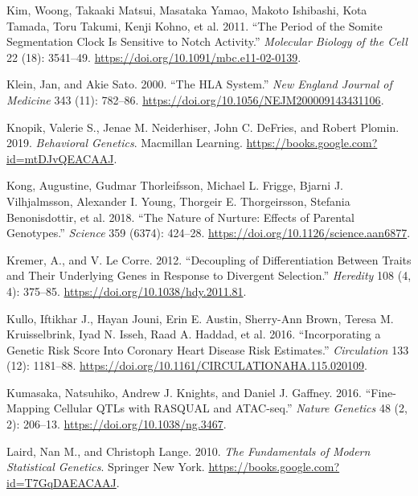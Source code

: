 \documentclass[
]{book}
\newlength{\cslhangindent}
\newlength{\cslentryspacingunit} %
\newenvironment{CSLReferences}[2] %
 {%
  \setlength{\parindent}{0pt}
  \ifodd #1
  \let\oldpar\par
  \def\par{\hangindent=\cslhangindent\oldpar}
  \fi
  \setlength{\parskip}{#2\cslentryspacingunit}
 }%
 {}
\begin{document}
\begin{CSLReferences}{1}{0}
\leavevmode{}%
Kim, Woong, Takaaki Matsui, Masataka Yamao, Makoto Ishibashi, Kota Tamada, Toru Takumi, Kenji Kohno, et al. 2011. {``The Period of the Somite Segmentation Clock Is Sensitive to {Notch} Activity.''} \emph{Molecular Biology of the Cell} 22 (18): 3541--49. \url{https://doi.org/10.1091/mbc.e11-02-0139}.

\leavevmode{}%
Klein, Jan, and Akie Sato. 2000. {``The {HLA System}.''} \emph{New England Journal of Medicine} 343 (11): 782--86. \url{https://doi.org/10.1056/NEJM200009143431106}.

\leavevmode{}%
Knopik, Valerie S., Jenae M. Neiderhiser, John C. DeFries, and Robert Plomin. 2019. \emph{Behavioral {Genetics}}. {Macmillan Learning}. \url{https://books.google.com?id=mtDJvQEACAAJ}.

\leavevmode{}%
Kong, Augustine, Gudmar Thorleifsson, Michael L. Frigge, Bjarni J. Vilhjalmsson, Alexander I. Young, Thorgeir E. Thorgeirsson, Stefania Benonisdottir, et al. 2018. {``The Nature of Nurture: {Effects} of Parental Genotypes.''} \emph{Science} 359 (6374): 424--28. \url{https://doi.org/10.1126/science.aan6877}.

\leavevmode{}%
Kremer, A., and V. Le Corre. 2012. {``Decoupling of Differentiation Between Traits and Their Underlying Genes in Response to Divergent Selection.''} \emph{Heredity} 108 (4, 4): 375--85. \url{https://doi.org/10.1038/hdy.2011.81}.

\leavevmode{}%
Kullo, Iftikhar J., Hayan Jouni, Erin E. Austin, Sherry-Ann Brown, Teresa M. Kruisselbrink, Iyad N. Isseh, Raad A. Haddad, et al. 2016. {``Incorporating a {Genetic Risk Score Into Coronary Heart Disease Risk Estimates}.''} \emph{Circulation} 133 (12): 1181--88. \url{https://doi.org/10.1161/CIRCULATIONAHA.115.020109}.

\leavevmode{}%
Kumasaka, Natsuhiko, Andrew J. Knights, and Daniel J. Gaffney. 2016. {``Fine-Mapping Cellular {QTLs} with {RASQUAL} and {ATAC-seq}.''} \emph{Nature Genetics} 48 (2, 2): 206--13. \url{https://doi.org/10.1038/ng.3467}.

\leavevmode{}%
Laird, Nan M., and Christoph Lange. 2010. \emph{The {Fundamentals} of {Modern Statistical Genetics}}. {Springer New York}. \url{https://books.google.com?id=T7GqDAEACAAJ}.


\end{CSLReferences}
\end{document}

